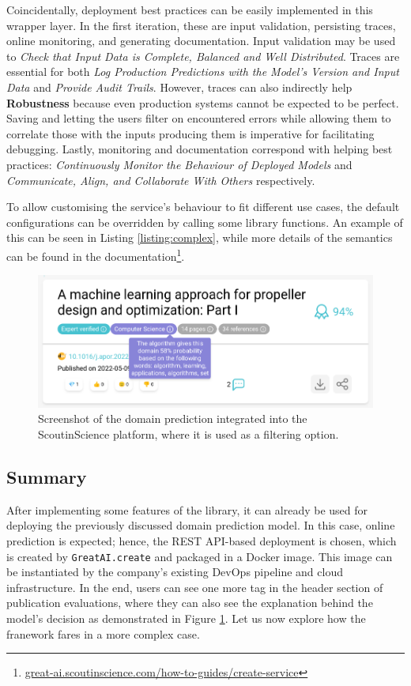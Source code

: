 Coincidentally, deployment best practices can be easily implemented in this wrapper layer. In the first iteration, these are input validation, persisting traces, online monitoring, and generating documentation. Input validation may be used to \textit{Check that Input Data is Complete, Balanced and Well Distributed}. Traces are essential for both \textit{Log Production Predictions with the Model's Version and Input Data} and \textit{Provide Audit Trails}. However, traces can also indirectly help \textbf{Robustness} because even production systems cannot be expected to be perfect. Saving and letting the users filter on encountered errors while allowing them to correlate those with the inputs producing them is imperative for facilitating debugging. Lastly, monitoring and documentation correspond with helping best practices: \textit{Continuously Monitor the Behaviour of Deployed Models} and \textit{Communicate, Align, and Collaborate With Others} respectively.

To allow customising the service's behaviour to fit different use cases, the default configurations can be overridden by calling some library functions. An example of this can be seen in Listing \ref{listing:complex}, while more details of the semantics can be found in the documentation\footnote{\href{https://great-ai.scoutinscience.com/how-to-guides/create-service/}{great-ai.scoutinscience.com/how-to-guides/create-service}}.

\begin{figure}[H]
    \centering
    \includegraphics[width=0.85\linewidth]{figures/dashboard-domains.png}
    \captionsetup{width=.9\linewidth}
    \caption{Screenshot of the domain prediction integrated into the ScoutinScience platform, where it is used as a filtering option.}
    \label{fig:dashboard-domains}
\end{figure}

\subsection{Summary}

After implementing some features of the library, it can already be used for deploying the previously discussed domain prediction model. In this case, online prediction is expected; hence, the REST API-based deployment is chosen, which is created by \texttt{GreatAI.create} and packaged in a Docker image. This image can be instantiated by the company's existing DevOps pipeline and cloud infrastructure. In the end, users can see one more tag in the header section of publication evaluations, where they can also see the explanation behind the model's decision as demonstrated in Figure \ref{fig:dashboard-domains}. Let us now explore how the franework fares in a more complex case.
